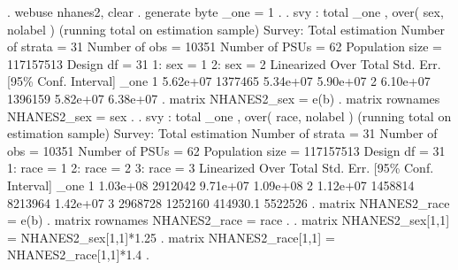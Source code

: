 . webuse nhanes2, clear
{\smallskip}
. generate byte _one = 1
{\smallskip}
.
. svy : total _one , over( sex, nolabel )
(running total on estimation sample)
{\smallskip}
Survey: Total estimation
{\smallskip}
Number of strata =      31       Number of obs    =      10351
Number of PSUs   =      62       Population size  =  117157513
                                 Design df        =         31
{\smallskip}
            1: sex = 1
            2: sex = 2
{\smallskip}
             {\VBAR}             Linearized
        Over {\VBAR}      Total   Std. Err.     [95\% Conf. Interval]
_one         {\VBAR}
           1 {\VBAR}   5.62e+07    1377465      5.34e+07    5.90e+07
           2 {\VBAR}   6.10e+07    1396159      5.82e+07    6.38e+07
{\smallskip}
. matrix NHANES2_sex = e(b)
{\smallskip}
. matrix rownames NHANES2_sex = sex
{\smallskip}
.
{\smallskip}
. svy : total _one , over( race, nolabel )
(running total on estimation sample)
{\smallskip}
Survey: Total estimation
{\smallskip}
Number of strata =      31       Number of obs    =      10351
Number of PSUs   =      62       Population size  =  117157513
                                 Design df        =         31
{\smallskip}
            1: race = 1
            2: race = 2
            3: race = 3
{\smallskip}
\cnp
{}
             {\VBAR}             Linearized
        Over {\VBAR}      Total   Std. Err.     [95\% Conf. Interval]
_one         {\VBAR}
           1 {\VBAR}   1.03e+08    2912042      9.71e+07    1.09e+08
           2 {\VBAR}   1.12e+07    1458814       8213964    1.42e+07
           3 {\VBAR}    2968728    1252160      414930.1     5522526
{\smallskip}
. matrix NHANES2_race = e(b)
{\smallskip}
. matrix rownames NHANES2_race = race
{\smallskip}
.
. matrix NHANES2_sex[1,1] = NHANES2_sex[1,1]*1.25
{\smallskip}
. matrix NHANES2_race[1,1] = NHANES2_race[1,1]*1.4
{\smallskip}
.
